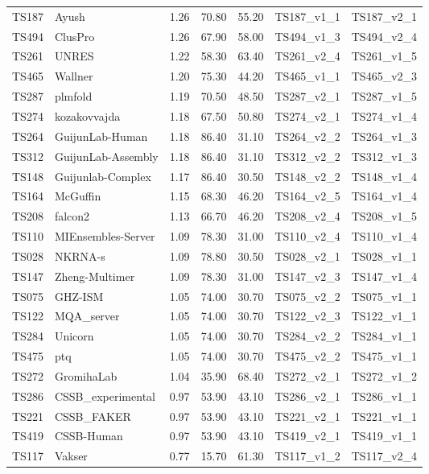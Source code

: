 \begin{longtable}{lllllll}
TS187 & Ayush & 1.26 & 70.80 & 55.20 & TS187\_v1\_1 & TS187\_v2\_1 \\ 
TS494 & ClusPro & 1.26 & 67.90 & 58.00 & TS494\_v1\_3 & TS494\_v2\_4 \\ 
TS261 & UNRES & 1.22 & 58.30 & 63.40 & TS261\_v2\_4 & TS261\_v1\_5 \\ 
TS465 & Wallner & 1.20 & 75.30 & 44.20 & TS465\_v1\_1 & TS465\_v2\_3 \\ 
TS287 & plmfold & 1.19 & 70.50 & 48.50 & TS287\_v2\_1 & TS287\_v1\_5 \\ 
TS274 & kozakovvajda & 1.18 & 67.50 & 50.80 & TS274\_v2\_1 & TS274\_v1\_4 \\ 
TS264 & GuijunLab-Human & 1.18 & 86.40 & 31.10 & TS264\_v2\_2 & TS264\_v1\_3 \\ 
TS312 & GuijunLab-Assembly & 1.18 & 86.40 & 31.10 & TS312\_v2\_2 & TS312\_v1\_3 \\ 
TS148 & Guijunlab-Complex & 1.17 & 86.40 & 30.50 & TS148\_v2\_2 & TS148\_v1\_4 \\ 
TS164 & McGuffin & 1.15 & 68.30 & 46.20 & TS164\_v2\_5 & TS164\_v1\_4 \\ 
TS208 & falcon2 & 1.13 & 66.70 & 46.20 & TS208\_v2\_4 & TS208\_v1\_5 \\ 
TS110 & MIEnsembles-Server & 1.09 & 78.30 & 31.00 & TS110\_v2\_4 & TS110\_v1\_4 \\ 
TS028 & NKRNA-s & 1.09 & 78.80 & 30.50 & TS028\_v2\_1 & TS028\_v1\_1 \\ 
TS147 & Zheng-Multimer & 1.09 & 78.30 & 31.00 & TS147\_v2\_3 & TS147\_v1\_4 \\ 
TS075 & GHZ-ISM & 1.05 & 74.00 & 30.70 & TS075\_v2\_2 & TS075\_v1\_1 \\ 
TS122 & MQA\_server & 1.05 & 74.00 & 30.70 & TS122\_v2\_3 & TS122\_v1\_1 \\ 
TS284 & Unicorn & 1.05 & 74.00 & 30.70 & TS284\_v2\_2 & TS284\_v1\_1 \\ 
TS475 & ptq & 1.05 & 74.00 & 30.70 & TS475\_v2\_2 & TS475\_v1\_1 \\ 
TS272 & GromihaLab & 1.04 & 35.90 & 68.40 & TS272\_v2\_1 & TS272\_v1\_2 \\ 
TS286 & CSSB\_experimental & 0.97 & 53.90 & 43.10 & TS286\_v2\_1 & TS286\_v1\_1 \\ 
TS221 & CSSB\_FAKER & 0.97 & 53.90 & 43.10 & TS221\_v2\_1 & TS221\_v1\_1 \\ 
TS419 & CSSB-Human & 0.97 & 53.90 & 43.10 & TS419\_v2\_1 & TS419\_v1\_1 \\ 
TS117 & Vakser & 0.77 & 15.70 & 61.30 & TS117\_v1\_2 & TS117\_v2\_4 \\ 

\end{longtable}
